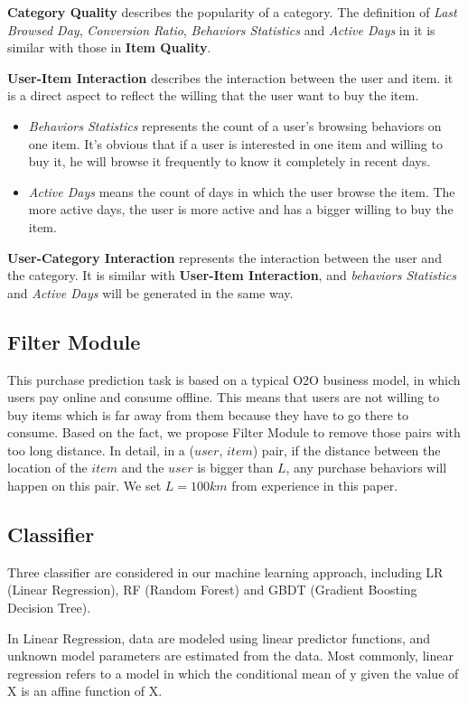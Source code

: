 \documentclass{llncs}
\begin{document}
\textbf{Category Quality} describes the popularity of a category.
The definition of \emph{Last Browsed Day}, \emph{Conversion Ratio},
\emph{Behaviors Statistics} and \emph{Active Days} in it is similar
with those in \textbf{Item Quality}.

\textbf{User-Item Interaction} describes the interaction between the user and item.
it is a direct aspect to reflect the willing that the user want to buy the item.
\begin{itemize}
	\item \emph{Behaviors Statistics} represents the count of a user's browsing behaviors on one item.
	It's obvious that if a user is interested in one item and willing to buy it,
	he will browse it frequently to know it completely in recent days.
	
	\item \emph{Active Days} means the count of days in which the user browse the item.
	The more active days, the user is more active and has a bigger willing to buy the item.
\end{itemize}

\textbf{User-Category Interaction} represents the interaction between the user and the category.
It is similar with \textbf{User-Item Interaction},
and \emph{behaviors Statistics} and \emph{Active Days} will be generated in the same way.

\subsection{Filter Module}
This purchase prediction task is based on a typical O2O business model,
in which users pay online and consume offline.
This means that users are not willing to buy items
which is far away from them because they have to
go there to consume.
Based on the fact, we propose Filter Module to
remove those pairs with too long distance.
In detail,
in a ($user$, $item$) pair,
if the distance between the location of the $item$ and the $user$ is bigger than $L$,
any purchase behaviors will happen on this pair.
We set $L = 100km$ from experience in this paper.

\subsection{Classifier}
Three classifier are considered in our machine learning approach,
including LR (Linear Regression), RF (Random Forest) and GBDT (Gradient Boosting Decision Tree).

In Linear Regression, data are modeled using linear predictor functions,
and unknown model parameters are estimated from the data.
Most commonly, linear regression refers to a model
in which the conditional mean of y given the value of X
is an affine function of X.
\end{document}
